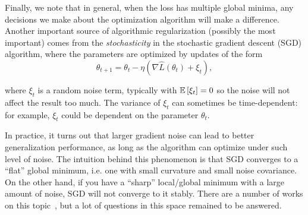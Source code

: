 Finally, we note that in general, when the loss has multiple global minima, any decisions we make about the optimization algorithm will make a difference. Another important source of algorithmic regularization (possibly the most important) comes from the \textit{stochasticity} in the stochastic gradient descent (SGD) algorithm, where the parameters are optimized by updates of the form
\begin{equation}
\theta_{t+1} = \theta_t - \eta(\nabla\hat{L}(\theta_t) + \xi_t),
\end{equation}

where $\xi_t$ is a random noise term, typically with $\mathbb{E}\left[\xi_t\right]=0$ so the noise will not affect the result too much. The variance of $\xi_t$ can sometimes be time-dependent: for example, $\xi_t$ could be dependent on the parameter $\theta_t$. 

In practice, it turns out that larger gradient noise can lead to better generalization performance, as long as the algorithm can optimize under such level of noise. The intuition behind this phenomenon is that SGD converges to a ``flat'' global minimum, i.e. one with small curvature and small noise covariance. On the other hand, if you have a ``sharp'' local/global minimum with a large amount of noise, SGD will not converge to it stably. There are a number of works on this topic~\cite{haochen2020shape,blanc2020implicit}, but a lot of questions in this space remained to be answered.

